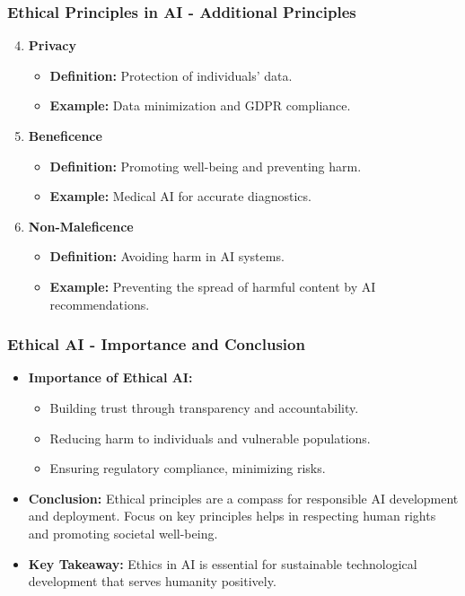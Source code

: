 \documentclass{beamer}
\begin{document}
\begin{frame}[fragile]
    \frametitle{Ethical Principles in AI - Additional Principles}
    \begin{enumerate}
        \setcounter{enumi}{3} %
        \item \textbf{Privacy}
            \begin{itemize}
                \item \textbf{Definition:} Protection of individuals' data.
                \item \textbf{Example:} Data minimization and GDPR compliance.
            \end{itemize}
        \item \textbf{Beneficence}
            \begin{itemize}
                \item \textbf{Definition:} Promoting well-being and preventing harm.
                \item \textbf{Example:} Medical AI for accurate diagnostics.
            \end{itemize}
        \item \textbf{Non-Maleficence}
            \begin{itemize}
                \item \textbf{Definition:} Avoiding harm in AI systems.
                \item \textbf{Example:} Preventing the spread of harmful content by AI recommendations.
            \end{itemize}
    \end{enumerate}
\end{frame}

\begin{frame}[fragile]
    \frametitle{Ethical AI - Importance and Conclusion}
    \begin{itemize}
        \item \textbf{Importance of Ethical AI:}
            \begin{itemize}
                \item Building trust through transparency and accountability.
                \item Reducing harm to individuals and vulnerable populations.
                \item Ensuring regulatory compliance, minimizing risks.
            \end{itemize}
        \item \textbf{Conclusion:}
            Ethical principles are a compass for responsible AI development and deployment. Focus on key principles helps in respecting human rights and promoting societal well-being.
        \item \textbf{Key Takeaway:} 
            Ethics in AI is essential for sustainable technological development that serves humanity positively.
    \end{itemize}
\end{frame}
\end{document}
